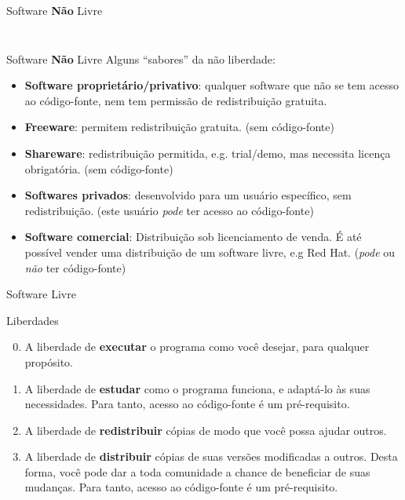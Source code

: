 \documentclass{beamer}
\begin{document}
\begin{frame}{Software \textbf{Não} Livre}
\begin{columns}
\begin{column}{0.2\textwidth}
\begin{figure}
            \end{figure}
        \end{column}
    \end{columns}
\end{frame}

\begin{frame}{Software \textbf{Não} Livre}
    Alguns ``sabores'' da não liberdade:
    \begin{itemize}
        \item \textbf{Software proprietário/privativo}: qualquer software que não se tem acesso ao código-fonte, nem tem permissão de redistribuição gratuita.
        \item \textbf{Freeware}: permitem redistribuição gratuita. (sem código-fonte)
        \item \textbf{Shareware}: redistribuição permitida, e.g. trial/demo, mas necessita licença obrigatória. (sem código-fonte)
        \item \textbf{Softwares privados}: desenvolvido para um usuário específico, sem redistribuição. (este usuário \textit{pode} ter acesso ao código-fonte)
        \item \textbf{Software comercial}: Distribuição sob licenciamento de venda. É até possível vender uma distribuição de um software livre, e.g Red Hat. (\textit{pode} ou \textit{não} ter código-fonte)
    \end{itemize}
\end{frame}

\begin{frame}{Software Livre}
    \begin{block}{Liberdades}
        \begin{enumerate}
            \setcounter{enumi}{-1}
            \item A liberdade de \textbf{executar} o programa como você desejar, para qualquer propósito.
            \item A liberdade de \textbf{estudar} como o programa funciona, e adaptá-lo às suas necessidades. Para tanto, acesso ao código-fonte é um pré-requisito.
            \item A liberdade de \textbf{redistribuir} cópias de modo que você possa ajudar outros.
            \item A liberdade de \textbf{distribuir} cópias de suas versões modificadas a outros. Desta forma, você pode dar a toda comunidade a chance de beneficiar de suas mudanças. Para tanto, acesso ao código-fonte é um pré-requisito.
        \end{enumerate}
    \end{block}
\end{frame}
\end{document}
